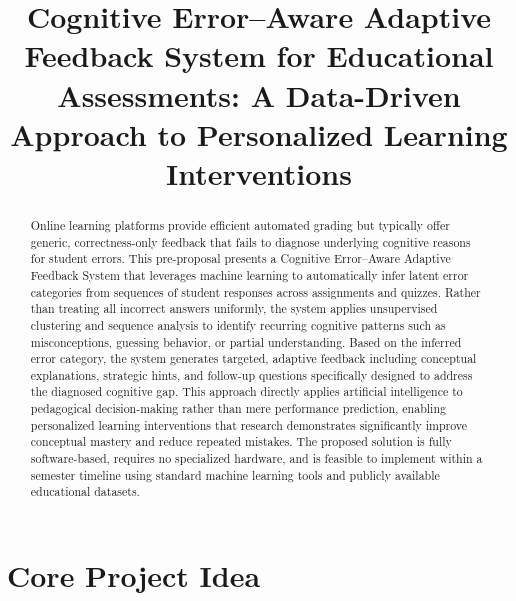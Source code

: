 \documentclass[conference]{IEEEtran}
\begin{document}
\title{Cognitive Error--Aware Adaptive Feedback System for Educational Assessments: A Data-Driven Approach to Personalized Learning Interventions}

\author{
}

\maketitle

\begin{abstract}
Online learning platforms provide efficient automated grading but typically offer generic, correctness-only feedback that fails to diagnose underlying cognitive reasons for student errors. This pre-proposal presents a Cognitive Error--Aware Adaptive Feedback System that leverages machine learning to automatically infer latent error categories from sequences of student responses across assignments and quizzes. Rather than treating all incorrect answers uniformly, the system applies unsupervised clustering and sequence analysis to identify recurring cognitive patterns such as misconceptions, guessing behavior, or partial understanding. Based on the inferred error category, the system generates targeted, adaptive feedback including conceptual explanations, strategic hints, and follow-up questions specifically designed to address the diagnosed cognitive gap. This approach directly applies artificial intelligence to pedagogical decision-making rather than mere performance prediction, enabling personalized learning interventions that research demonstrates significantly improve conceptual mastery and reduce repeated mistakes. The proposed solution is fully software-based, requires no specialized hardware, and is feasible to implement within a semester timeline using standard machine learning tools and publicly available educational datasets.
\end{abstract}

\section{Core Project Idea}
\end{document}
